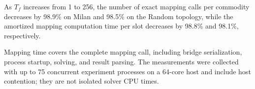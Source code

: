 As $T_f$ increases from 1 to 256, the number of exact mapping calls per commodity decreases by 98.9\% on Milan and 98.5\% on the Random topology, while the amortized mapping computation time per slot decreases by 98.8\% and 98.1\%, respectively.

Mapping time covers the complete mapping call, including bridge serialization, process startup, solving, and result parsing. The measurements were collected with up to 75 concurrent experiment processes on a 64-core host and include host contention; they are not isolated solver CPU times.
